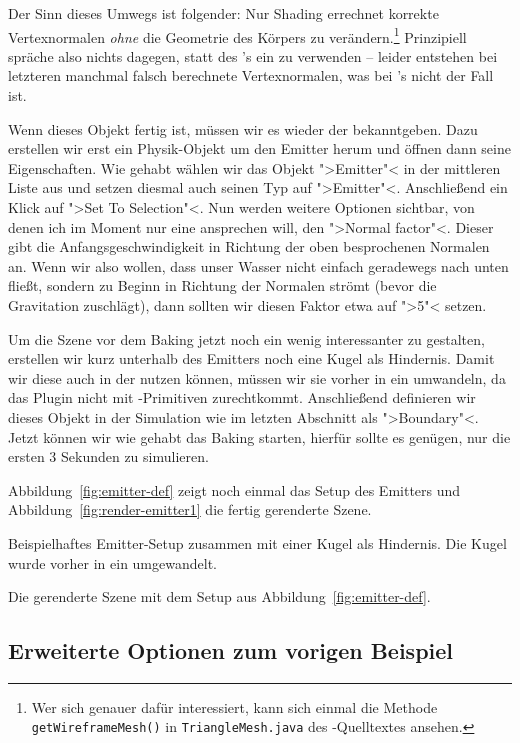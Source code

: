 \documentclass[10pt,DIV=14,a4paper]{scrartcl}
\begin{document}
\itE

Der Sinn dieses Umwegs ist folgender: Nur Shading errechnet korrekte
Vertexnormalen \emph{ohne} die Geometrie des Körpers zu
verändern.\footnote{Wer sich genauer dafür interessiert, kann sich
einmal die Methode \texttt{getWireframeMesh()} in
\texttt{TriangleMesh.java} des \aoi-Quelltextes ansehen.} Prinzipiell
spräche also nichts dagegen, statt des \TriMesh's ein \PolyMesh zu
verwenden -- leider entstehen bei letzteren manchmal falsch berechnete
Vertexnormalen, was bei \TriMesh's nicht der Fall ist.

Wenn dieses Objekt fertig ist, müssen wir es wieder der \fluidsim
bekanntgeben. Dazu erstellen wir erst ein
Physik-Objekt um den Emitter herum und öffnen dann seine Eigenschaften.
Wie gehabt wählen wir das Objekt ">Emitter"< in der mittleren Liste aus
und setzen diesmal auch seinen Typ auf ">Emitter"<. Anschließend ein
Klick auf ">Set To Selection"<. Nun werden weitere Optionen sichtbar,
von denen ich im Moment nur eine ansprechen will, den ">Normal factor"<.
Dieser gibt die Anfangsgeschwindigkeit in Richtung der oben besprochenen
Normalen an.  Wenn wir also wollen, dass unser Wasser nicht einfach
geradewegs nach unten fließt, sondern zu Beginn in Richtung der Normalen
strömt (bevor die Gravitation zuschlägt), dann sollten wir diesen Faktor
etwa auf ">5"< setzen.

Um die Szene vor dem Baking jetzt noch ein wenig interessanter zu
gestalten, erstellen wir kurz unterhalb des Emitters noch eine Kugel als
Hindernis. Damit wir diese auch in der \fluidsim nutzen können, müssen
wir sie vorher in ein \TriMesh umwandeln, da das Plugin nicht mit
\aoi-Primitiven zurechtkommt. Anschließend definieren wir dieses Objekt
in der Simulation wie im letzten Abschnitt als ">Boundary"<. Jetzt
können wir wie gehabt das Baking starten, hierfür sollte es genügen, nur
die ersten 3 Sekunden zu simulieren.

Abbildung~\ref{fig:emitter-def} zeigt noch einmal das Setup des Emitters
und Abbildung~\ref{fig:render-emitter1} die fertig gerenderte Szene.

{Beispielhaftes Emitter-Setup zusammen mit einer Kugel als Hindernis.
Die Kugel wurde vorher in ein \TriMesh umgewandelt.}

{Die gerenderte Szene mit dem Setup aus
Abbildung~\ref{fig:emitter-def}.}

\subsection{Erweiterte Optionen zum vorigen Beispiel}
\end{document}
